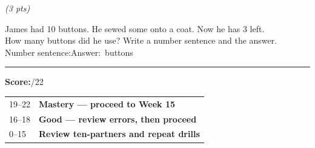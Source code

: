 \documentclass[12pt, letterpaper]{article}
\begin{document}
\bigskip\bigskip
{} \hfill \textit{(3 pts)}

\bigskip
\prob James had 10 buttons. He sewed some onto a coat. Now he has 3 left.\\
How many buttons did he use? Write a number sentence and the answer.\\[10pt]
\hspace{2em}Number sentence:\ansblanklg \quad Answer:\ansblank\ buttons

\bigskip
{\color{sd-gold}\rule{\linewidth}{0.5pt}}

\begin{instructbox}
\textbf{Score:}\underline{\hspace{1.5cm}}/22\hfill
\begin{tabular}{@{}ll@{}}
19--22 & \textbf{\color{sd-green}Mastery — proceed to Week 15}\\
16--18 & \textbf{\color{sd-gold}Good — review errors, then proceed}\\
0--15  & \textbf{\color{red!70!black}Review ten-partners and repeat drills}
\end{tabular}
\end{instructbox}
\end{document}
